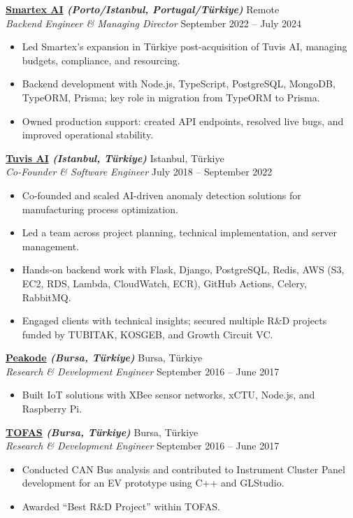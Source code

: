 \documentclass[10pt,a4paper]{extarticle}
\begin{document}
\noindent\textbf{\href{https://smartex.ai}{Smartex AI} \textit{(Porto/Istanbul, Portugal/Türkiye)}} \hfill Remote\\
\textit{Backend Engineer \& Managing Director} \hfill September 2022 --  July 2024
\begin{itemize}[leftmargin=*,noitemsep,topsep=0pt]
    \item Led Smartex’s expansion in Türkiye post-acquisition of Tuvis AI, managing budgets, compliance, and resourcing.
    \item Backend development with Node.js, TypeScript, PostgreSQL, MongoDB, TypeORM, Prisma; key role in migration from TypeORM to Prisma.
    \item Owned production support: created API endpoints, resolved live bugs, and improved operational stability.
\end{itemize}


\noindent\textbf{\href{https://www.tuvisai.com}{Tuvis AI} \textit{(Istanbul, Türkiye)}} \hfill Istanbul, Türkiye\\
\textit{Co-Founder \& Software Engineer} \hfill July 2018 -- September 2022
\begin{itemize}[leftmargin=*,noitemsep,topsep=0pt]
    \item Co-founded and scaled AI-driven anomaly detection solutions for manufacturing process optimization.
    \item Led a team across project planning, technical implementation, and server management.
    \item Hands-on backend work with Flask, Django, PostgreSQL, Redis, AWS (S3, EC2, RDS, Lambda, CloudWatch, ECR), GitHub Actions, Celery, RabbitMQ.
    \item Engaged clients with technical insights; secured multiple R\&D projects funded by TUBITAK, KOSGEB, and Growth Circuit VC.
\end{itemize}

\noindent\textbf{\href{https://www.peakode.com}{Peakode} \textit{(Bursa, Türkiye)}} \hfill Bursa, Türkiye\\
\textit{Research \& Development Engineer} \hfill September 2016 -- June 2017
\begin{itemize}[leftmargin=*,noitemsep,topsep=0pt]
    \item Built IoT solutions with XBee sensor networks, xCTU, Node.js, and Raspberry Pi.
\end{itemize}

\noindent\textbf{\href{https://www.tofas.com.tr}{TOFAS} \textit{(Bursa, Türkiye)}} \hfill Bursa, Türkiye\\
\textit{Research \& Development Engineer} \hfill September 2016 -- June 2017
\begin{itemize}[leftmargin=*,noitemsep,topsep=0pt]
    \item Conducted CAN Bus analysis and contributed to Instrument Cluster Panel development for an EV prototype using C++ and GLStudio.
    \item Awarded ``Best R\&D Project'' within TOFAS.
\end{itemize}
\end{document}
